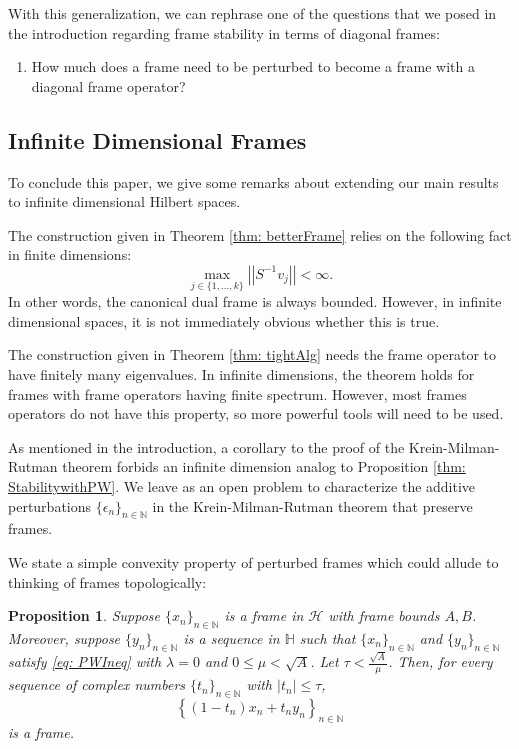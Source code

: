 \documentclass[11pt, reqno]{amsart}
\providecommand{\N}{\mathbb N}
\newcommand{\norm}[1]{\left|\left| #1 \right|\right|}
\newtheorem{prop}[theorem]{Proposition}
\numberwithin{equation}{section}
\begin{document}
With this generalization, we can rephrase one of the questions that we posed in the introduction regarding frame stability in terms of diagonal frames:

\begin{enumerate}
    \item[(2*)] How much does a frame need to be perturbed to become a frame with a diagonal frame operator? 
\end{enumerate}

\subsection{Infinite Dimensional Frames}
To conclude this paper, we give some remarks about extending our main results to infinite dimensional Hilbert spaces.

The construction given in Theorem \ref{thm: betterFrame} relies on the following fact in finite dimensions: $$\max_{j \in \{1,...,k\}} \norm{S^{-1}v_j}<\infty.$$ In other words, the canonical dual frame is always bounded. However, in infinite dimensional spaces, it is not immediately obvious whether this is true. 

The construction given in Theorem \ref{thm: tightAlg} needs the frame operator to have finitely many eigenvalues. In infinite dimensions, the theorem holds for frames with frame operators having finite spectrum. However, most frames operators do not have this property, so more powerful tools will need to be used.

As mentioned in the introduction, a corollary to the proof of the Krein-Milman-Rutman theorem forbids an infinite dimension analog to Proposition \ref{thm: StabilitywithPW}. We leave as an open problem to characterize the  additive perturbations  $\{\epsilon_n\}_{n \in \N}$ in the Krein-Milman-Rutman theorem   that preserve frames. 

\medskip
We state a simple convexity property of perturbed frames which could allude to thinking of frames topologically:

\begin{prop}\label{prop:convexExtension}
    Suppose $\{x_n\}_{n \in \N}$ is a frame in $\mathcal{H}$ with frame bounds $A,B$. Moreover, suppose $\{y_n\}_{n \in \N}$ is a sequence in $\mathbb{H}$ such that $\{x_n\}_{n \in \N}$ and $\{y_n\}_{n \in \N}$ satisfy \eqref{eq: PWIneq} with $\lambda=0$ and $0\le \mu<\sqrt{A}$. Let $\tau < \frac{\sqrt{A}}{\mu}$. Then, for every sequence of complex numbers $\{t_n\}_{n \in \N}$ with $|t_n|\le \tau$, $$\left\{(1-t_n)x_n+t_ny_n\right\}_{n \in \N}$$ is a frame.
\end{prop}
\end{document}
